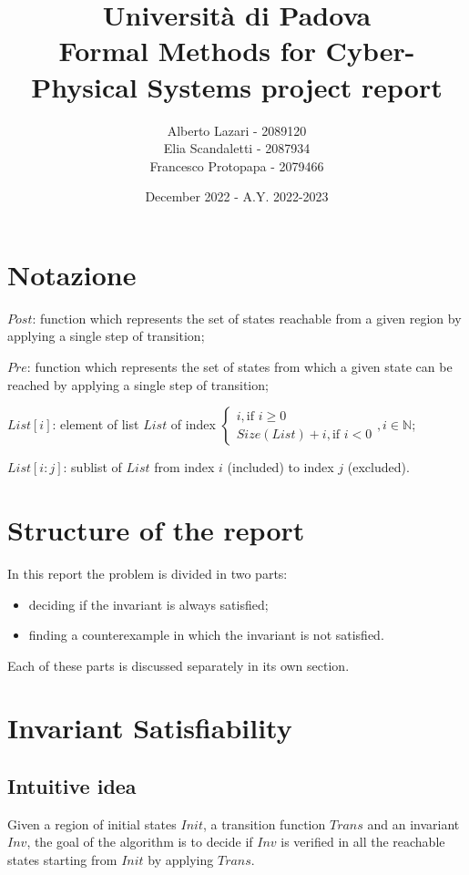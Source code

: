 \documentclass[12pt]{article}
\title{\textbf{Università di Padova \\ Formal Methods for Cyber-Physical Systems project report}}
\author{Alberto Lazari - 2089120 \\ Elia Scandaletti - 2087934 \\ Francesco Protopapa - 2079466 \\}
\date{December 2022 - A.Y. 2022-2023}
\begin{document}
    \maketitle
    \pagebreak


    \section{Notazione}
    \begin{description}
        \item $Post$: function which represents the set of states reachable from a given region by applying a single step of transition;
        \item $Pre$: function which represents the set of states from which a given state can be reached by applying a single step of transition;
        \item $List[i]$: element of list $List$ of index $
        \begin{cases}
            i, \mbox{if } i \geq 0 \\
             Size(List) + i, \mbox{if } i < 0
        \end{cases}, i \in \mathbb N$;
        \item $List[i:j]$: sublist of $List$ from index $i$ (included) to index $j$ (excluded). 
    \end{description}

    \section{Structure of the report}
    In this report the problem is divided in two parts:
    \begin{itemize}
        \item deciding if the invariant is always satisfied;
        \item finding a counterexample in which the invariant is not satisfied.
    \end{itemize}
    Each of these parts is discussed separately in its own section.

    \section{Invariant Satisfiability}
    \subsection{Intuitive idea}
    Given a region of initial states $Init$, a transition function $Trans$ and an invariant $Inv$, the goal of the algorithm is to decide if $Inv$ is verified in all the reachable states starting from $Init$ by applying $Trans$.
\end{document}
